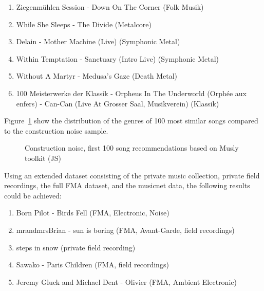 \begin{enumerate}
	\setlength\itemsep{-0.5em}
	\item Ziegenm\"uhlen Session - Down On The Corner (Folk Musik)
	\item While She Sleeps - The Divide (Metalcore)
	\item Delain - Mother Machine (Live) (Symphonic Metal)
	\item Within Temptation - Sanctuary (Intro Live) (Symphonic Metal)
	\item Without A Martyr - Medusa's Gaze (Death Metal)
	\item 100 Meisterwerke der Klassik - Orpheus In The Underworld (Orph\'ee aux enfers) - Can-Can (Live At Grosser Saal, Musikverein) (Klassik)
\end{enumerate}

\noindent Figure~\ref{fig:constn} show the distribution of the genres of 100 most similar songs compared to the construction noise sample.  

\begin{figure}[htbp]
	\centering
	\caption{Construction noise, first 100 song recommendations based on Musly toolkit (JS)}
	\label{fig:constn}
\end{figure}

\noindent Using an extended dataset consisting of the private music collection, private field recordings, the full FMA dataset, and the musicnet data, the following results could be achieved: 

\begin{enumerate}
	\setlength\itemsep{-0.5em}
	\item Born Pilot - Birds Fell (FMA, Electronic, Noise)
	\item mrandmrsBrian - sun is boring (FMA, Avant-Garde, field recordings)
	\item steps in snow (private field recording)
	\item Sawako - Paris Children (FMA, field recordings)
	\item Jeremy Gluck and Michael Dent - Olivier (FMA, Ambient Electronic)
\end{enumerate}


